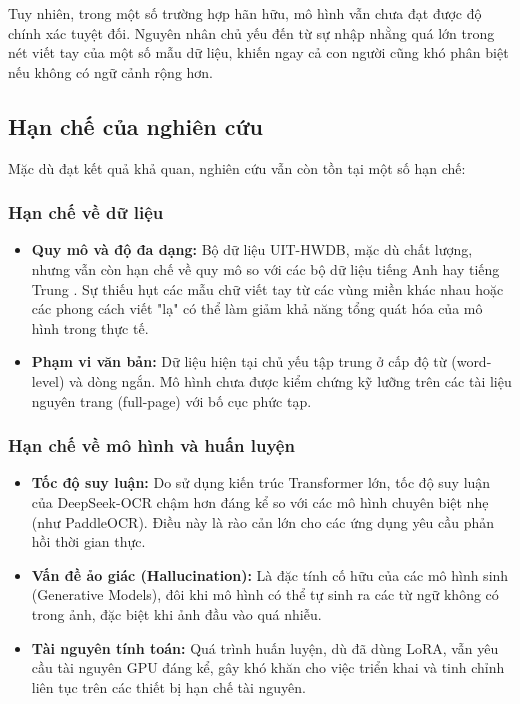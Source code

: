 Tuy nhiên, trong một số trường hợp hãn hữu, mô hình vẫn chưa đạt được độ chính xác tuyệt đối. Nguyên nhân chủ yếu đến từ sự nhập nhằng quá lớn trong nét viết tay của một số mẫu dữ liệu, khiến ngay cả con người cũng khó phân biệt nếu không có ngữ cảnh rộng hơn.

\subsection{Hạn chế của nghiên cứu}

Mặc dù đạt kết quả khả quan, nghiên cứu vẫn còn tồn tại một số hạn chế:

\subsubsection{Hạn chế về dữ liệu}
\begin{itemize}
    \item \textbf{Quy mô và độ đa dạng:} Bộ dữ liệu UIT-HWDB, mặc dù chất lượng, nhưng vẫn còn hạn chế về quy mô so với các bộ dữ liệu tiếng Anh hay tiếng Trung \cite{le2025surveyvietnamesedocumentanalysis}. Sự thiếu hụt các mẫu chữ viết tay từ các vùng miền khác nhau hoặc các phong cách viết "lạ" có thể làm giảm khả năng tổng quát hóa của mô hình trong thực tế.
    \item \textbf{Phạm vi văn bản:} Dữ liệu hiện tại chủ yếu tập trung ở cấp độ từ (word-level) và dòng ngắn. Mô hình chưa được kiểm chứng kỹ lưỡng trên các tài liệu nguyên trang (full-page) với bố cục phức tạp.
\end{itemize}

\subsubsection{Hạn chế về mô hình và huấn luyện}
\begin{itemize}
    \item \textbf{Tốc độ suy luận:} Do sử dụng kiến trúc Transformer lớn, tốc độ suy luận của DeepSeek-OCR chậm hơn đáng kể so với các mô hình chuyên biệt nhẹ (như PaddleOCR). Điều này là rào cản lớn cho các ứng dụng yêu cầu phản hồi thời gian thực.
    \item \textbf{Vấn đề ảo giác (Hallucination):} Là đặc tính cố hữu của các mô hình sinh (Generative Models), đôi khi mô hình có thể tự sinh ra các từ ngữ không có trong ảnh, đặc biệt khi ảnh đầu vào quá nhiễu.
    \item \textbf{Tài nguyên tính toán:} Quá trình huấn luyện, dù đã dùng LoRA, vẫn yêu cầu tài nguyên GPU đáng kể, gây khó khăn cho việc triển khai và tinh chỉnh liên tục trên các thiết bị hạn chế tài nguyên.
\end{itemize}

